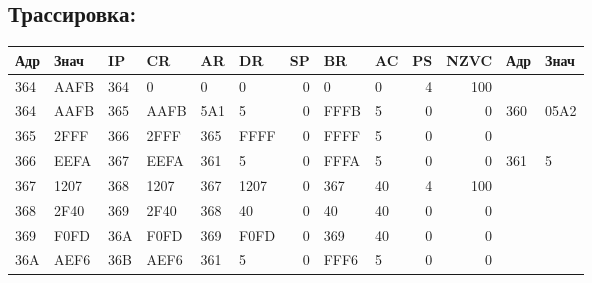 \subsection{Трассировка:}
\begin{center}
    \begin{tabular}{|l|l|l|l|l|l|r|l|l|r|r|l|l|}
        \toprule
        \textbf{Адр} & \textbf{Знач} & \textbf{IP} & \textbf{CR} & \textbf{AR} & \textbf{DR} & \textbf{SP} & \textbf{BR} & \textbf{AC} & \textbf{PS} & \textbf{NZVC} & \textbf{Адр} & \textbf{Знач} \\
        \midrule
        364          & AAFB          & 364         & 0           & 0           & 0           & 0           & 0           & 0           & 4           & 100           &              &               \\
        \hline
        364          & AAFB          & 365         & AAFB        & 5A1         & 5           & 0           & FFFB        & 5           & 0           & 0             & 360          & 05A2          \\
        \hline
        365          & 2FFF          & 366         & 2FFF        & 365         & FFFF        & 0           & FFFF        & 5           & 0           & 0             &              &               \\
        \hline
        366          & EEFA          & 367         & EEFA        & 361         & 5           & 0           & FFFA        & 5           & 0           & 0             & 361          & 5             \\
        \hline
        367          & 1207          & 368         & 1207        & 367         & 1207        & 0           & 367         & 40          & 4           & 100           &              &               \\
        \hline
        368          & 2F40          & 369         & 2F40        & 368         & 40          & 0           & 40          & 40          & 0           & 0             &              &               \\
        \hline
        369          & F0FD          & 36A         & F0FD        & 369         & F0FD        & 0           & 369         & 40          & 0           & 0             &              &               \\
        \hline
        36A          & AEF6          & 36B         & AEF6        & 361         & 5           & 0           & FFF6        & 5           & 0           & 0             &              &               \\

\end{tabular}
\end{center}
